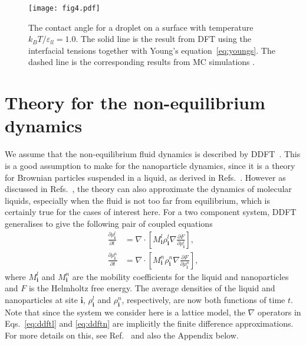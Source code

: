 \documentclass[journal=langd5,manuscript=article]{achemso}
\def\i{\mathbf{i}}
\def\e{\varepsilon}
\begin{document}
\begin{figure}
\centering
  \texttt{[image: fig4.pdf]}
\caption{%
  The contact angle for a droplet on a surface with temperature
  $k_BT/\e_{ll} = 1.0$. The solid line is the result from DFT using the
  interfacial tensions together with Young's equation~\eqref{eq:youngs}.
  The dashed line is the corresponding results from MC simulations \cite{chalmers2017}.
}
\label{fig:contact-angle}
\end{figure}

\section{Theory for the non-equilibrium dynamics}\label{dynamics}

We assume that the non-equilibrium fluid dynamics is described by DDFT~\cite{MaTa99, MaTa00, ArEv04, ArRa04}. This is a good assumption to make for the nanoparticle dynamics, since it is a theory for Brownian particles suspended in a liquid, as derived in Refs.~. However as discussed in Refs.~, the theory can also approximate the dynamics of molecular liquids, especially when the fluid is not too far from equilibrium, which is certainly true for the cases of interest here. For a two component system, DDFT generalises to give the following pair of coupled equations \cite{archer05}
%
\begin{align}
\frac{\partial \rho^l_\i}{\partial t}
  &= \nabla \cdot
  \left[
    M^l_\i \rho^l_\i \nabla \frac{\partial F}{\partial \rho_{\i}^l}
  \right],
\label{eq:ddftl}
  \\
\frac{\partial \rho^n_\i}{\partial t}
  &= \nabla \cdot
  \left[
    M^n_\i \rho^n_\i \nabla \frac{\partial F}{\partial \rho_{\i}^n}
  \right],
\label{eq:ddftn}
\end{align}
%
where $M^l_\i$ and $M^n_\i$ are the mobility coefficients for the liquid
and nanoparticles and $F$ is the Helmholtz free energy. The average densities of the liquid and nanoparticles at site $\i$, $\rho^l_\i$ and $\rho^n_\i$, respectively, are now both functions of time $t$. Note
that since the system we consider here is a lattice model, the $\nabla$
operators in Eqs.~\eqref{eq:ddftl} and \eqref{eq:ddftn} are implicitly
the finite difference approximations. For more details on this, see
Ref.~ and also the Appendix below.
\end{document}
